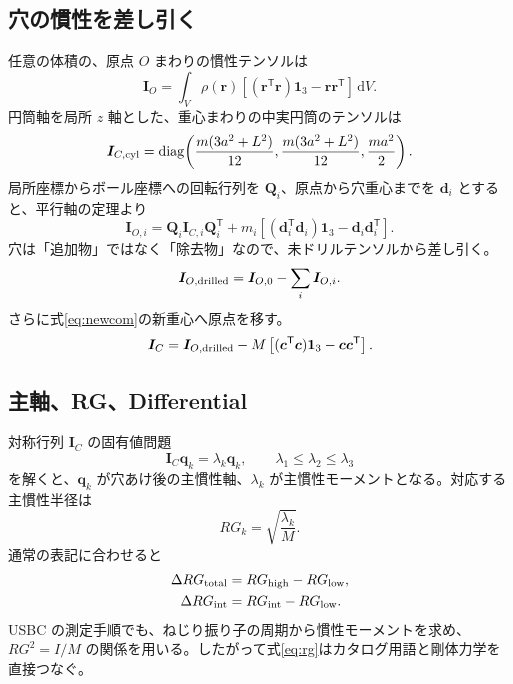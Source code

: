 \documentclass[11pt,a4paper]{article}
\newcommand{\vect}[1]{\bm{#1}}
\newcommand{\mat}[1]{\bm{#1}}
\newcommand{\dd}{\,\mathrm{d}}
\begin{document}
\subsection{穴の慣性を差し引く}

任意の体積の、原点 $O$ まわりの慣性テンソルは
\begin{equation}
 \mat I_O=\int_V\rho(\vect r)
 \left[(\vect r^{\mathsf T}\vect r)\mat 1_3-\vect r\vect r^{\mathsf T}\right]\dd V.
 \label{eq:inertiatensor}
\end{equation}
円筒軸を局所 $z$ 軸とした、重心まわりの中実円筒のテンソルは
\begin{equation}
 \mat I_{C,\rm cyl}=
 \operatorname{diag}\!\left(
 \frac{m(3a^2+L^2)}{12},
 \frac{m(3a^2+L^2)}{12},
 \frac{ma^2}{2}
 \right).
\end{equation}
局所座標からボール座標への回転行列を $\mat Q_i$、原点から穴重心までを $\vect d_i$ とすると、平行軸の定理より
\begin{equation}
 \mat I_{O,i}=\mat Q_i\mat I_{C,i}\mat Q_i^{\mathsf T}
 +m_i\left[(\vect d_i^{\mathsf T}\vect d_i)\mat 1_3-\vect d_i\vect d_i^{\mathsf T}\right].
 \label{eq:parallel}
\end{equation}
穴は「追加物」ではなく「除去物」なので、未ドリルテンソルから差し引く。
\begin{equation}
 \mat I_{O,\rm drilled}=\mat I_{O,0}-\sum_i\mat I_{O,i}.
\end{equation}
さらに式\eqref{eq:newcom}の新重心へ原点を移す。
\begin{equation}
 \mat I_C=\mat I_{O,\rm drilled}
 -M\left[(\vect c^{\mathsf T}\vect c)\mat 1_3-\vect c\vect c^{\mathsf T}\right].
 \label{eq:shiftcom}
\end{equation}

\subsection{主軸、RG、Differential}

対称行列 $\mat I_C$ の固有値問題
\begin{equation}
 \mat I_C\vect q_k=\lambda_k\vect q_k,
 \qquad \lambda_1\le\lambda_2\le\lambda_3
 \label{eq:eigen}
\end{equation}
を解くと、$\vect q_k$ が穴あけ後の主慣性軸、$\lambda_k$ が主慣性モーメントとなる。対応する主慣性半径は
\begin{equation}
 RG_k=\sqrt{\frac{\lambda_k}{M}}.
 \label{eq:rg}
\end{equation}
通常の表記に合わせると
\begin{align}
 \Delta RG_{\rm total}&=RG_{\rm high}-RG_{\rm low},\\
 \Delta RG_{\rm int}&=RG_{\rm int}-RG_{\rm low}.
\end{align}
USBC の測定手順でも、ねじり振り子の周期から慣性モーメントを求め、$RG^2=I/M$ の関係を用いる\cite{usbc_sop13}。したがって式\eqref{eq:rg}はカタログ用語と剛体力学を直接つなぐ。
\end{document}
